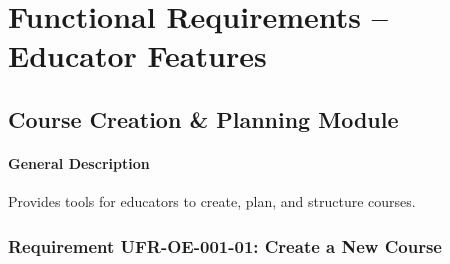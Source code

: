 \section{Functional Requirements – Educator Features}

\subsection{Course Creation \& Planning Module}
\paragraph{General Description}
Provides tools for educators to create, plan, and structure courses.

\subsubsection{Requirement UFR-OE-001-01: Create a New Course}
